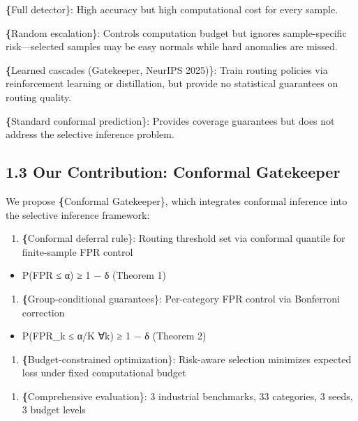 \documentclass[10pt]{article}
\begin{document}
\textbf\{Full detector\}: High accuracy but high computational cost for every sample.

\textbf\{Random escalation\}: Controls computation budget but ignores sample-specific risk—selected samples may be easy normals while hard anomalies are missed.

\textbf\{Learned cascades (Gatekeeper, NeurIPS 2025)\}: Train routing policies via reinforcement learning or distillation, but provide no statistical guarantees on routing quality.

\textbf\{Standard conformal prediction\}: Provides coverage guarantees but does not address the selective inference problem.

\subsection{1.3 Our Contribution: Conformal Gatekeeper}

We propose \textbf\{Conformal Gatekeeper\}, which integrates conformal inference into the selective inference framework:

\begin{enumerate}
\item \textbf\{Conformal deferral rule\}: Routing threshold set via conformal quantile for finite-sample FPR control
\end{enumerate}
\begin{itemize}
\item P(FPR ≤ α) ≥ 1 − δ (Theorem 1)
\end{itemize}

\begin{enumerate}
\item \textbf\{Group-conditional guarantees\}: Per-category FPR control via Bonferroni correction
\end{enumerate}
\begin{itemize}
\item P(FPR\_k ≤ α/K ∀k) ≥ 1 − δ (Theorem 2)
\end{itemize}

\begin{enumerate}
\item \textbf\{Budget-constrained optimization\}: Risk-aware selection minimizes expected loss under fixed computational budget
\end{enumerate}

\begin{enumerate}
\item \textbf\{Comprehensive evaluation\}: 3 industrial benchmarks, 33 categories, 3 seeds, 3 budget levels
\end{enumerate}
\end{document}
